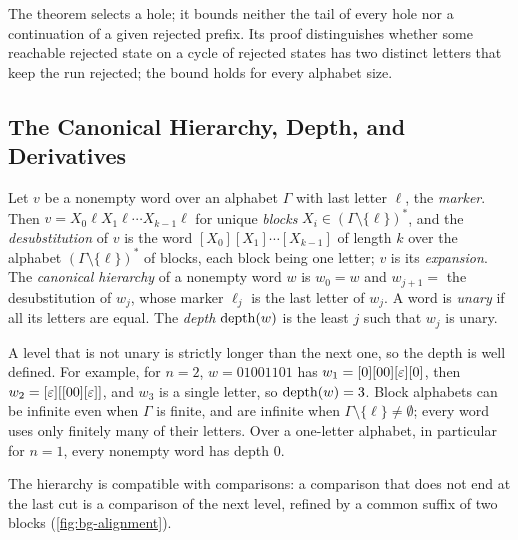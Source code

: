 The theorem selects a hole; it bounds neither the tail of every hole nor a
continuation of a given rejected prefix. Its proof distinguishes whether some
reachable rejected state on a cycle of rejected states has two distinct letters
that keep the run rejected; the bound holds for every alphabet size.

\subsection{The Canonical Hierarchy, Depth, and Derivatives}\label{sec:bg-hierarchy}

\begin{definition}\label{def:bg-hierarchy}
Let $v$ be a nonempty word over an alphabet $\Gamma$ with last letter $\ell$,
the \emph{marker}. Then $v=X_0\ell X_1\ell\cdots X_{k-1}\ell$ for unique
\emph{blocks} $X_i\in(\Gamma\setminus\{\ell\})^*$, and the
\emph{desubstitution} of $v$ is the word $[X_0][X_1]\cdots[X_{k-1}]$ of length
$k$ over the alphabet $(\Gamma\setminus\{\ell\})^*$ of blocks, each block being
one letter; $v$ is its \emph{expansion}. The \emph{canonical hierarchy} of a
nonempty word $w$ is $w_0=w$ and $w_{j+1}=$ the desubstitution of $w_j$, whose
marker $\ell_j$ is the last letter of $w_j$. A word is \emph{unary} if all its
letters are equal. The \emph{depth} $\operatorname{depth}(w)$ is the least $j$ such that $w_j$
is unary.
\end{definition}

A level that is not unary is strictly longer than the next one, so the depth is
well defined. For example, for $n=2$, $w=01001101$
has $w_1=[0][00][\varepsilon][0]$, then $w_2=[\varepsilon][[00][\varepsilon]]$, and $w_3$ is a single
letter, so $\operatorname{depth}(w)=3$. Block alphabets can be infinite even when $\Gamma$ is
finite, and are infinite when $\Gamma\setminus\{\ell\}\ne\emptyset$; every word uses only finitely many of their letters. Over a one-letter
alphabet, in particular for $n=1$, every nonempty word has depth $0$.

The hierarchy is compatible with comparisons: a comparison that does not end at
the last cut is a comparison of the next level, refined by a common suffix of
two blocks (\cref{fig:bg-alignment}).

